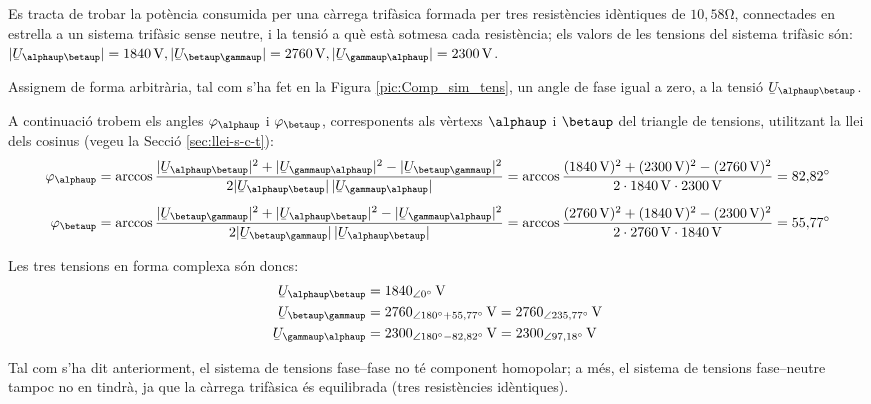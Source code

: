 \begin{exemple}
Es tracta de trobar la pot\`{e}ncia consumida per una c\`{a}rrega trif\`{a}sica
formada per tres resist\`{e}ncies id\`{e}ntiques de $10{,}58\unit{\ohm}$,
connectades en estrella a un sistema trif\`{a}sic sense neutre, i la
tensi\'{o} a qu\`{e} est\`{a} sotmesa cada resist\`{e}ncia; els valors de les
tensions del sistema trif\`{a}sic s\'{o}n: $|\cmplx{U}_{\alphaup\betaup}| =
1840\unit{V}, |\cmplx{U}_{\betaup\gammaup}| = 2760\unit{V},
|\cmplx{U}_{\gammaup\alphaup}| = 2300\unit{V}$.

Assignem de forma arbitr\`{a}ria, tal com s'ha fet en la Figura
\vref{pic:Comp_sim_tens}, un angle de fase igual a zero, a la tensi\'{o}
$\cmplx{U}_{\alphaup\betaup}$.

A continuaci\'{o} trobem els angles $\varphi_\alphaup$ i $\varphi_\betaup$,
corresponents als v\`{e}rtexs  $\alphaup$ i $\betaup$ del triangle de
tensions, utilitzant la llei dels cosinus (vegeu la Secci\'{o}
\vref{sec:llei-s-c-t}): 
\begin{align*}
    \varphi_\alphaup &= \arccos \frac{|\cmplx{U}_{\alphaup\betaup}|^2 + |\cmplx{U}_{\gammaup\alphaup}|^2 -
    |\cmplx{U}_{\betaup\gammaup}|^2}{2 |\cmplx{U}_{\alphaup\betaup}| \,|\cmplx{U}_{\gammaup\alphaup}|} =
    \arccos \frac{(1840\unit{V})^2 + (2300\unit{V})^2 - (2760\unit{V})^2}{2 \cdot 1840\unit{V}
    \cdot 2300\unit{V}} = 82{,}82\degree \\[1ex]
    \varphi_\betaup &= \arccos \frac{|\cmplx{U}_{\betaup\gammaup}|^2 + |\cmplx{U}_{\alphaup\betaup}|^2 -
    |\cmplx{U}_{\gammaup\alphaup}|^2}{2 |\cmplx{U}_{\betaup\gammaup}| \,|\cmplx{U}_{\alphaup\betaup}|} =
    \arccos \frac{(2760\unit{V})^2 + (1840\unit{V})^2 - (2300\unit{V})^2}{2 \cdot 2760\unit{V}
    \cdot 1840\unit{V}} = 55{,}77\degree
\end{align*}

Les tres tensions en forma complexa s\'{o}n doncs:
\begin{align*}
\cmplx{U}_{\alphaup\betaup} &= 1840_{\angle 0\degree}\unit{V} \\
\cmplx{U}_{\betaup\gammaup} &= 2760_{\angle 180\degree +
55{,}77\degree}\unit{V} =
2760_{\angle 235{,}77\degree}\unit{V} \\
\cmplx{U}_{\gammaup\alphaup} &= 2300_{\angle 180\degree -
82{,}82\degree}\unit{V} = 2300_{\angle 97{,}18\degree}
\unit{V}
\end{align*}

Tal com s'ha dit anteriorment, el sistema de tensions fase--fase no
t\'{e} component homopolar; a m\'{e}s, el sistema de tensions fase--neutre
tampoc no en tindr\`{a}, ja que la c\`{a}rrega trif\`{a}sica \'{e}s equilibrada
(tres resist\`{e}ncies id\`{e}ntiques).


\end{exemple}
